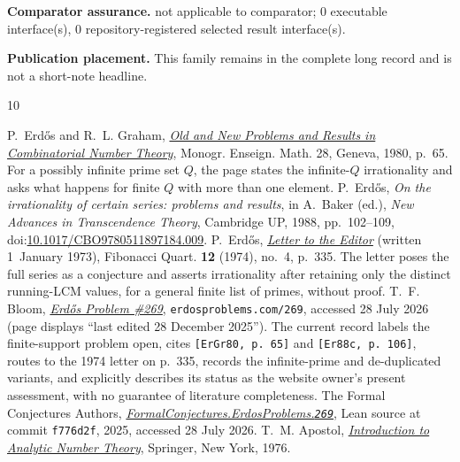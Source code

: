 \documentclass[11pt]{article}
\begin{document}
\textbf{Comparator assurance.} not applicable to comparator; 0 executable interface(s), 0 repository-registered selected result interface(s).

\textbf{Publication placement.} This family remains in the complete long record and is not a short-note headline.
\begin{thebibliography}{10}
\small
\raggedright
\setlength{\itemsep}{0pt}
 P.~Erd\H{o}s and R.~L. Graham,
  \href{https://mathweb.ucsd.edu/~ronspubs/80_11_number_theory.pdf}{\emph{Old
  and New Problems and Results in Combinatorial Number Theory}},
  Monogr. Enseign. Math. 28, Geneva, 1980, p.~65.  For a possibly infinite
  prime set $Q$, the page states the infinite-$Q$ irrationality and asks what
  happens for finite $Q$ with more than one element.
 P.~Erd\H{o}s, \emph{On the irrationality of certain series:
  problems and results}, in A.~Baker (ed.), \emph{New Advances in Transcendence
  Theory}, Cambridge UP, 1988, pp.~102--109,
  doi:\href{https://doi.org/10.1017/CBO9780511897184.009}{10.1017/CBO9780511897184.009}.
 P.~Erd\H{o}s,
  \href{https://www.fq.math.ca/Scanned/12-4/letter.pdf}{\emph{Letter to the
  Editor}} (written 1~January 1973), Fibonacci Quart. \textbf{12} (1974),
  no.~4, p.~335.  The letter poses the full series as a conjecture and asserts
  irrationality after retaining only the distinct running-LCM values, for a
  general finite list of primes, without proof.
 T.~F. Bloom,
  \href{https://www.erdosproblems.com/269}{\emph{Erd\H{o}s Problem \#269}},
  \texttt{erdosproblems.com/269}, accessed 28 July 2026 (page displays
  ``last edited 28 December 2025'').  The current record labels the
  finite-support problem open, cites \texttt{[ErGr80, p.~65]} and
  \texttt{[Er88c, p.~106]}, routes to the 1974 letter on p.~335, records the
  infinite-prime and de-duplicated variants, and explicitly describes its
  status as the website owner's present assessment, with no guarantee of
  literature completeness.
 The Formal Conjectures Authors,
  \href{https://github.com/google-deepmind/formal-conjectures/blob/f776d2f2039351b00737ffcafb9d7d7666e1d9af/FormalConjectures/ErdosProblems/269.lean}
  {\emph{FormalConjectures.ErdosProblems.\texttt{269}}},
  Lean source at commit \texttt{f776d2f}, 2025, accessed 28 July 2026.
 T.~M. Apostol,
  \href{https://doi.org/10.1007/978-1-4757-5579-4}
  {\emph{Introduction to Analytic Number Theory}},
  Springer, New York, 1976.

\end{thebibliography}
\end{document}
